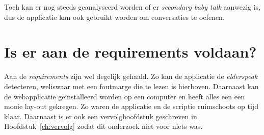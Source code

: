 Toch kan er nog steeds geanalyseerd worden of er \textit{secondary baby talk} aanwezig is, dus de applicatie kan ook gebruikt worden om conversaties te oefenen.

\section{Is er aan de requirements voldaan?}
Aan de \textit{requirements} zijn wel degelijk gehaald. Zo kan de applicatie de \textit{elderspeak} detecteren, weliswaar met een foutmarge die te lezen is hierboven.
Daarnaast kan de webapplicatie geïnstalleerd worden op een computer en heeft alles een een mooie lay-out gekregen.
Zo waren de applicatie en de scriptie ruimschoots op tijd klaar. Daarnaast is er ook een vervolghoofdstuk geschreven in Hoofdstuk~\ref{ch:vervolg} zodat dit onderzoek niet voor niets was.
